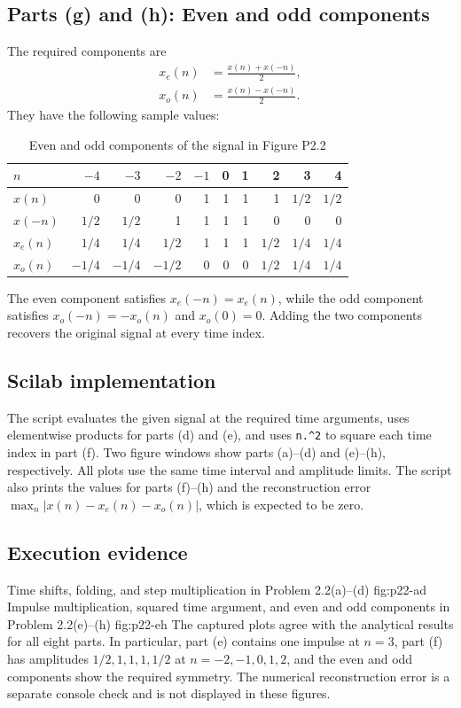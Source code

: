 \subsection{Parts (g) and (h): Even and odd components}
The required components are
\begin{align}
  x_e(n)&=\frac{x(n)+x(-n)}{2},\\
  x_o(n)&=\frac{x(n)-x(-n)}{2}.
\end{align}
They have the following sample values:
\begin{table}[H]
  \centering
  \caption{Even and odd components of the signal in Figure P2.2}
  \label{tab:p22-even-odd}
  \begin{tabular}{lrrrrrrrrr}
    \toprule
    $n$ & $-4$ & $-3$ & $-2$ & $-1$ & 0 & 1 & 2 & 3 & 4\\
    \midrule
    $x(n)$ & 0 & 0 & 0 & 1 & 1 & 1 & 1 & $1/2$ & $1/2$\\
    $x(-n)$ & $1/2$ & $1/2$ & 1 & 1 & 1 & 1 & 0 & 0 & 0\\
    $x_e(n)$ & $1/4$ & $1/4$ & $1/2$ & 1 & 1 & 1 & $1/2$ & $1/4$ & $1/4$\\
    $x_o(n)$ & $-1/4$ & $-1/4$ & $-1/2$ & 0 & 0 & 0 & $1/2$ & $1/4$ & $1/4$\\
    \bottomrule
  \end{tabular}
\end{table}
The even component satisfies $x_e(-n)=x_e(n)$, while the odd component
satisfies $x_o(-n)=-x_o(n)$ and $x_o(0)=0$. Adding the two components
recovers the original signal at every time index.

\subsection{Scilab implementation}
The script evaluates the given signal at the required time arguments,
uses elementwise products for parts (d) and (e), and uses
\texttt{n.\^{}2} to square each time index in part (f). Two figure
windows show parts (a)--(d) and (e)--(h), respectively. All plots use
the same time interval and amplitude limits. The script also prints
the values for parts (f)--(h) and the reconstruction error
$\max_n|x(n)-x_e(n)-x_o(n)|$, which is expected to be zero.


\subsection{Execution evidence}
  {Time shifts, folding, and step multiplication in Problem 2.2(a)--(d)}
  {fig:p22-ad}
  {Impulse multiplication, squared time argument, and even and odd components in Problem 2.2(e)--(h)}
  {fig:p22-eh}
The captured plots agree with the analytical results for all eight parts.
In particular, part (e) contains one impulse at $n=3$, part (f) has
amplitudes $1/2,1,1,1,1/2$ at $n=-2,-1,0,1,2$, and the even and odd
components show the required symmetry. The numerical reconstruction
error is a separate console check and is not displayed in these figures.
